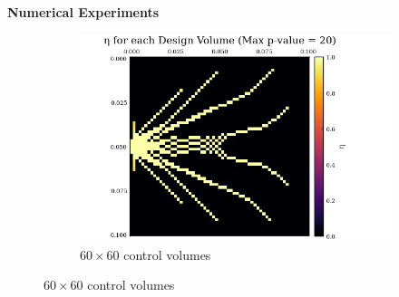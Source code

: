\documentclass[final]{beamer}
\begin{document}
\begin{frame}{\textbf{Numerical Experiments}}
\begin{figure}
\begin{center}
\begin{subfigure}{0.5\textwidth}
				\includegraphics[width=\linewidth]{60x60-Final_Design.png}
				\caption{$60\times 60$ control volumes}
				\label{fig:SIMP-Output-60}
			\end{subfigure}
		\end{center}
	\end{figure}
\end{frame}
\end{document}
